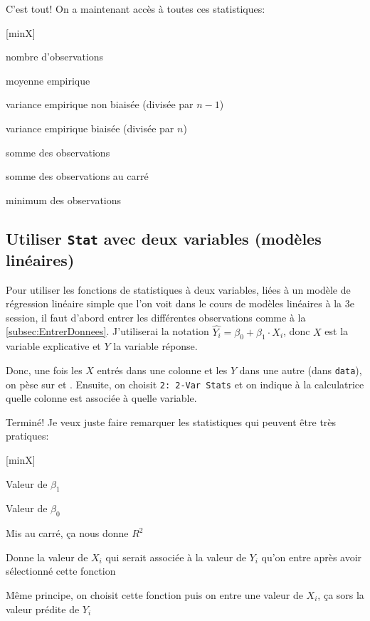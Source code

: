 \documentclass[french]{article}
\begin{document}
C'est tout! On a maintenant accès à toutes ces statistiques:

\begin{desclist}{\sf}{ \rm\hfill}[minX]

\item [n] nombre d'observations
\item [x] moyenne empirique
\item [Sx] variance empirique non biaisée (divisée par ${n - 1}$)
\item [$\sigma_{x}$] variance empirique biaisée (divisée par ${n}$)
\item [$\sum x$] somme des observations
\item [$\sum x^{2}$] somme des observations au carré
\item [minX] minimum des observations
\item [\ldots]

\end{desclist}



\subsection[Utiliser \texttt{Stat} avec deux variables]{Utiliser \texttt{Stat} avec deux variables (modèles linéaires)}
\label{subsec:statdeuxvariables}

Pour utiliser les fonctions de statistiques à deux variables, liées à un modèle de régression linéaire simple que l'on voit dans le cours de modèles linéaires à la 3e session, il faut d'abord entrer les différentes observations comme à la \ref{subsec:EntrerDonnees}. J'utiliserai la notation $\hat{Y_i} = \beta_0 + \beta_1 \cdot X_i$, donc $X$ est la variable explicative et $Y$ la variable réponse.

Donc, une fois les $X$ entrés dans une colonne et les $Y$ dans une autre (dans \texttt{data}), on pèse sur  et . Ensuite, on choisit \texttt{2: 2-Var Stats} et on indique à la calculatrice quelle colonne est associée à quelle variable.

Terminé! Je veux juste faire remarquer les statistiques qui peuvent être très pratiques:

\begin{desclist}{\sf}{ \rm\hfill}[minX]

\item [a] Valeur de $\beta_1$
\item [b] Valeur de $\beta_0$
\item [r] Mis au carré, ça nous donne $R^2$
\item [x'] Donne la valeur de $X_i$ qui serait associée à la valeur de $Y_i$ qu'on entre après avoir sélectionné cette fonction
\item [y'] Même principe, on choisit cette fonction puis on entre une valeur de $X_i$, ça sors la valeur prédite de $Y_i$

\end{desclist}
\end{document}
